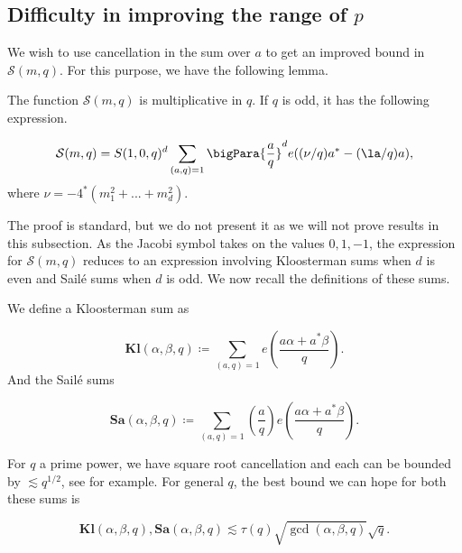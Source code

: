 \documentclass[11pt]{amsart}
\begin{document}
\subsection{Difficulty in improving the range of $p$}\label{4 SubSectionFailureToImprove}
We wish to use cancellation in the sum over $a$ to get an improved bound in $\mathcal{S}(m,q)$. For this purpose, we have the following lemma.
\begin{lemma}\label{3: singularSeriesLemma}
The function $\mathcal{S}(m,q)$ is multiplicative in $q$. If $q$ is odd, it has the following expression.

\begin{equation}\label{3: SingSeriesOddValueEqn}
     \mathcal{S}(m,q) = S(1,0,q)^d \sum_{(a,q)=1}\bigPara{\frac{a}{q}}^de((\nu/q)a^*-(\la/q)a),
\end{equation}
where $\nu=-4^*(m_1^2+...+m_d^2)$.
\end{lemma}
The proof is standard, but we do not present it as we will not prove results in this subsection.  As the Jacobi symbol takes on the values $0,1,-1$, the expression for $\mathcal{S}(m,q)$ reduces to an expression involving Kloosterman sums when $d$ is even and Sail\'e sums when $d$ is odd. We now recall the definitions of these sums.

\begin{definition}\label{3: SaileKloostermanSumsProp}
    We define a Kloosterman sum as

    \begin{equation}\label{KloostSumDefEqn}
        \textbf{Kl}(\alpha,\beta,q) \coloneq\sum_{(a,q)=1}e(\frac{a\alpha + a^*\beta}{q}).
    \end{equation}
    And the Sail\'e sums

    \begin{equation}\label{SalSumDefEqn}
        \textbf{Sa}(\alpha,\beta,q) \coloneq\sum_{(a,q)=1}(\frac{a}{q})e(\frac{a\alpha + a^*\beta}{q}).
    \end{equation}
\end{definition}
For $q$ a prime power, we have square root cancellation and each can be bounded by $\lesssim q^{1/2}$, see \cite{conradKloosterman2002} for example. For general $q$, the best bound we can hope for both these sums is

\begin{equation*}
    \textbf{Kl}(\alpha,\beta,q),\textbf{Sa}(\alpha,\beta,q) \lesssim \tau(q)\sqrt{\gcd(\alpha,\beta,q)}\sqrt{q}.
\end{equation*}
\end{document}
